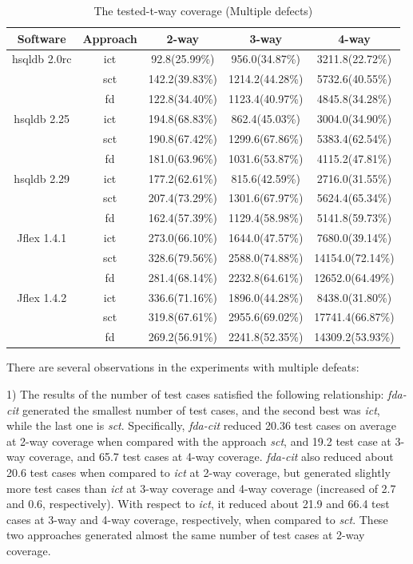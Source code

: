 \documentclass[10pt,journal,compsoc]{IEEEtran}
\begin{document}
{\begin{table}[ht]
\caption{The tested-t-way coverage (Multiple defects)}
\label{multiple_tdefects_tested-t-way}
\centering
\begin{tabular}{|c|c|c|c|c|} \hline
Software&  Approach & 2-way & 3-way & 4-way\\ \hline
hsqldb 2.0rc	&ict	&92.8(25.99\%)	&956.0(34.87\%)	&3211.8(22.72\%)	\\
	&sct	&142.2(39.83\%)	&1214.2(44.28\%)	&5732.6(40.55\%)	\\
	&fd	&122.8(34.40\%)	&1123.4(40.97\%)	&4845.8(34.28\%)	\\  \hline
hsqldb 2.25	&ict	&194.8(68.83\%)	&862.4(45.03\%)	&3004.0(34.90\%)	\\
	&sct	&190.8(67.42\%)	&1299.6(67.86\%)	&5383.4(62.54\%)	\\
	&fd	&181.0(63.96\%)	&1031.6(53.87\%)	&4115.2(47.81\%)	\\  \hline
hsqldb 2.29	&ict	&177.2(62.61\%)	&815.6(42.59\%)	&2716.0(31.55\%)	\\
	&sct	&207.4(73.29\%)	&1301.6(67.97\%)	&5624.4(65.34\%)	\\
	&fd	&162.4(57.39\%)	&1129.4(58.98\%)	&5141.8(59.73\%)	\\  \hline
Jflex 1.4.1	&ict	&273.0(66.10\%)	&1644.0(47.57\%)	&7680.0(39.14\%)	\\
	&sct	&328.6(79.56\%)	&2588.0(74.88\%)	&14154.0(72.14\%)	\\
	&fd	&281.4(68.14\%)	&2232.8(64.61\%)	&12652.0(64.49\%)	\\  \hline
Jflex 1.4.2	&ict	&336.6(71.16\%)	&1896.0(44.28\%)	&8438.0(31.80\%)	\\
	&sct	&319.8(67.61\%)	&2955.6(69.02\%)	&17741.4(66.87\%)	\\
	&fd	&269.2(56.91\%)	&2241.8(52.35\%)	&14309.2(53.93\%)	\\  \hline
\end{tabular}
\end{table}

There are several observations in the experiments with multiple defeats:

1) The results of the number of test cases satisfied the following relationship:  \emph{fda-cit} generated the smallest number of test cases, and the second best was \emph{ict}, while the last one is \emph{sct}.  Specifically, \emph{fda-cit} reduced 20.36 test cases on average at 2-way coverage when compared with the approach \emph{sct}, and 19.2 test case at 3-way coverage, and 65.7 test cases at 4-way coverage. \emph{fda-cit} also reduced about 20.6 test cases when compared to \emph{ict} at 2-way coverage, but generated slightly more test cases than \emph{ict} at 3-way coverage and 4-way coverage (increased of 2.7 and 0.6, respectively). With respect to \emph{ict}, it reduced about 21.9 and 66.4 test cases at 3-way and 4-way coverage, respectively, when compared to \emph{sct}. These two approaches generated almost the same number of test cases at 2-way coverage.


}
\end{document}
